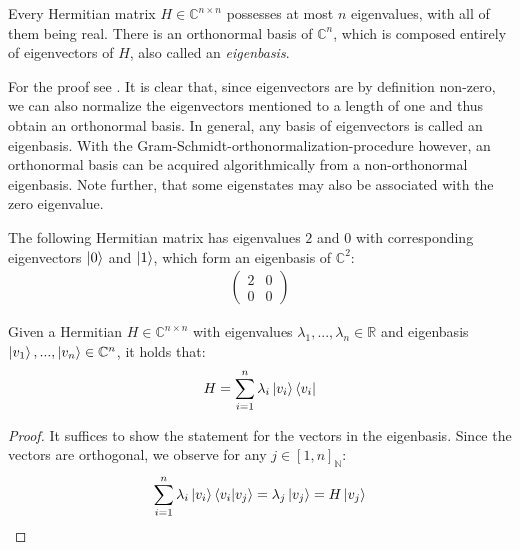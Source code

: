 \begin{theorem} \label{theorem_eigenbasis}
    Every Hermitian matrix \(H \in \mathbb{C}^{n \times n}\) possesses at most \(n\) eigenvalues, with all of them being real. There is an orthonormal basis of \(\mathbb{C}^n\), which is composed entirely of eigenvectors of \(H\), also called an \emph{eigenbasis}.
\end{theorem}

For the proof see \cite[pp. 360-362]{Fischer2020}. It is clear that, since eigenvectors are by definition non-zero, we can also normalize the eigenvectors mentioned to a length of one and thus obtain an orthonormal basis. In general, any basis of eigenvectors is called an eigenbasis. With the Gram-Schmidt-orthonormalization-procedure \cite[p. 185]{Janich2010} however, an orthonormal basis can be acquired algorithmically from a non-orthonormal eigenbasis. Note further, that some eigenstates may also be associated with the zero eigenvalue.

\begin{example} \label{example_hermitian_eigenbasis}
    The following Hermitian matrix has eigenvalues \(2\) and \(0\) with corresponding eigenvectors \(\ket{0}\) and \(\ket{1}\), which form an eigenbasis of \(\mathbb{C}^2\):
    \begin{align}
        \begin{pmatrix}
            2 & 0\\
            0 & 0
        \end{pmatrix}
    \end{align}
\end{example}

\begin{theorem} \label{theorem_spectral_decomposition}
    Given a Hermitian \(H \in \mathbb{C}^{n \times n}\) with eigenvalues \(\lambda_1, ..., \lambda_n \in \mathbb{R}\) and eigenbasis \(\ket{v_1}, ..., \ket{v_n} \in \mathbb{C}^n\), it holds that:
    \begin{align}
        H = \sum_{i=1}^n \lambda_i \ket{v_i}\bra{v_i}
    \end{align}
\end{theorem}

\begin{proof}
    It suffices to show the statement for the vectors in the eigenbasis. Since the vectors are orthogonal, we observe for any \(j \in [1, n]_{\mathbb{N}}\):
    \begin{align}
        \sum_{i=1}^n \lambda_i \ket{v_i}\braket{v_i}{v_j} = \lambda_j \ket{v_j} = H\ket{v_j}
    \end{align}
\end{proof}

